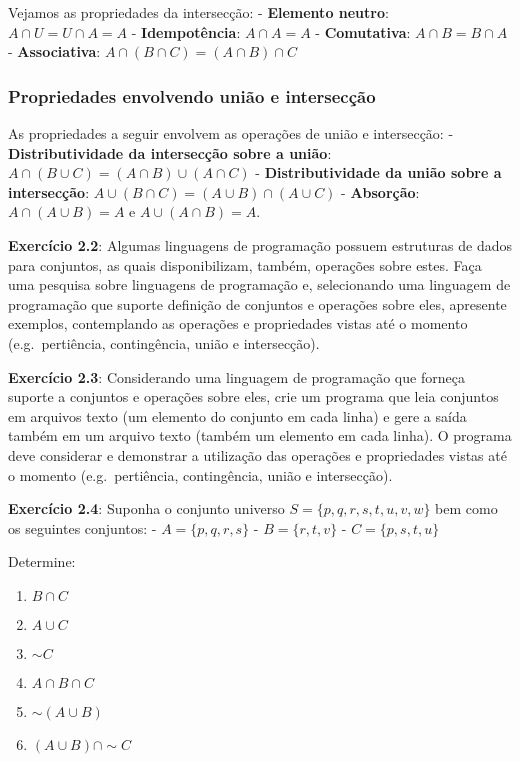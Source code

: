 \documentclass{article}
\begin{document}
Vejamos as propriedades da intersecção: - \textbf{Elemento neutro}:
\(A \cap U = U \cap A = A\) - \textbf{Idempotência}: \(A \cap A = A\) -
\textbf{Comutativa}: \(A \cap B = B \cap A\) - \textbf{Associativa}:
\(A \cap (B \cap C) = (A \cap B) \cap C\)


    \subsubsection{Propriedades envolvendo união e intersecção}


    As propriedades a seguir envolvem as operações de união e intersecção: -
\textbf{Distributividade da intersecção sobre a união}:
\(A \cap (B \cup C) = (A \cap B) \cup (A \cap C)\) -
\textbf{Distributividade da união sobre a intersecção}:
\(A \cup (B \cap C) = (A \cup B) \cap (A \cup C)\) - \textbf{Absorção}:
\(A \cap (A \cup B) = A\) e \(A \cup (A \cap B) = A\).

    \textbf{Exercício 2.2}: Algumas linguagens de programação possuem
estruturas de dados para conjuntos, as quais disponibilizam, também,
operações sobre estes. Faça uma pesquisa sobre linguagens de programação
e, selecionando uma linguagem de programação que suporte definição de
conjuntos e operações sobre eles, apresente exemplos, contemplando as
operações e propriedades vistas até o momento (e.g.~pertiência,
contingência, união e intersecção).

\textbf{Exercício 2.3}: Considerando uma linguagem de programação que
forneça suporte a conjuntos e operações sobre eles, crie um programa que
leia conjuntos em arquivos texto (um elemento do conjunto em cada linha)
e gere a saída também em um arquivo texto (também um elemento em cada
linha). O programa deve considerar e demonstrar a utilização das
operações e propriedades vistas até o momento (e.g.~pertiência,
contingência, união e intersecção).

\textbf{Exercício 2.4}: Suponha o conjunto universo
\(S = \{p, q, r, s, t, u, v, w\}\) bem como os seguintes conjuntos: -
\(A = \{p, q, r, s\}\) - \(B = \{r, t, v\}\) - \(C = \{p, s, t, u\}\)

Determine:

\begin{enumerate}
\def\labelenumi{\alph{enumi})}
\item
  \(B \cap C\)
\item
  \(A \cup C\)
\item
  \(\sim{C}\)
\item
  \(A \cap B \cap C\)
\item
  \(\sim(A \cup B)\)
\item
  \((A \cup B) \cap \sim{C}\)
\end{enumerate}


    
    
    
    
\end{document}
